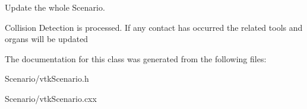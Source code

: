 Update the whole Scenario. 

Collision Detection is processed. If any contact has occurred the related tools and organs will be updated 

The documentation for this class was generated from the following files:\begin{DoxyCompactItemize}
\item 
Scenario/vtkScenario.h\item 
Scenario/vtkScenario.cxx\end{DoxyCompactItemize}
